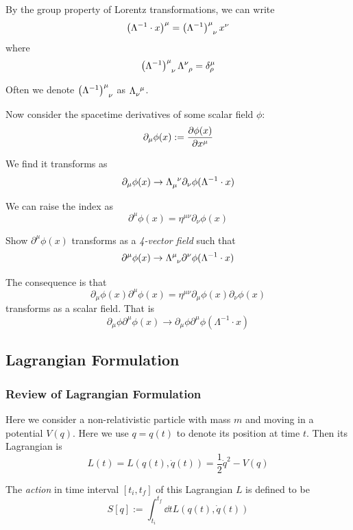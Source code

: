 \documentclass[a4paper,11pt]{article}
\begin{document}
	\begin{nt}
		By the group property of Lorentz transformations, we can write
		\[
			\left( \Lambda^{-1} \cdot x \right)^\mu = \left( \Lambda^{-1} \right)\indices{^\mu_\nu} x^\nu
		\]
		where
		\[
			\left( \Lambda^{-1} \right)\indices{^\mu_\nu} \LT{\nu}{\rho} = \delta_\rho^\mu
		\]

		Often we denote $\left( \Lambda^{-1} \right)\indices{^\mu_\nu}$ as $\iLT{\nu}{\mu}$.
	\end{nt}

	Now consider the spacetime derivatives of some scalar field $\phi$:
	\[
		\partial_\mu \phi(x) := \pdv{\phi(x)}{x^\mu}
	\]

	We find it transforms as 
	\[
		\partial_\mu \phi(x) \to \iLT{\mu}{\nu} \partial_\nu \phi(\Lambda^{-1} \cdot x)
	\]
	
	We can raise the index as 
	\[
		\partial^\mu \phi(x) = \eta^{\mu\nu} \partial_\nu \phi(x)
	\]
	
	\begin{exer}
		Show $\partial^\mu \phi(x)$ transforms as a \emph{4-vector field} such that
		\[
			\partial^\mu \phi(x) \to \LT{\mu}{\nu} \partial^\nu \phi(\Lambda^{-1} \cdot x)
		\]
	\end{exer}

	The consequence is that 
	\[
		\partial_\mu \phi(x) \partial^\mu \phi(x) = \eta^{\mu\nu} \partial_\mu \phi(x) \partial_\nu \phi(x)
	\]
	transforms as a scalar field. That is
	\[
		\partial_\mu \phi \partial^\mu \phi(x) \to \partial_\mu \phi\partial^\mu \phi(\Lambda^{-1} \cdot x)
	\]
	
	\subsection{Lagrangian Formulation} 

	\subsubsection{Review of Lagrangian Formulation}

	Here we consider a non-relativistic particle with mass $m$ and moving in a potential $V(q)$. Here we use $q = q(t)$ to denote its position at time $t$. Then its Lagrangian is
	\begin{equation}
		L(t) = L\left( q(t), \dot{q}(t) \right) = \frac{1}{2} \dot{q}^2 - V(q)
	\end{equation}

	The \emph{action} in time interval $[t_i, t_f]$ of this Lagrangian $L$ is defined to be 
	\begin{equation}
		S[q] := \int_{t_i}^{t_f} \dd{t} L \left( q(t),\dot{q}(t) \right)
	\end{equation}
	
\end{document}
